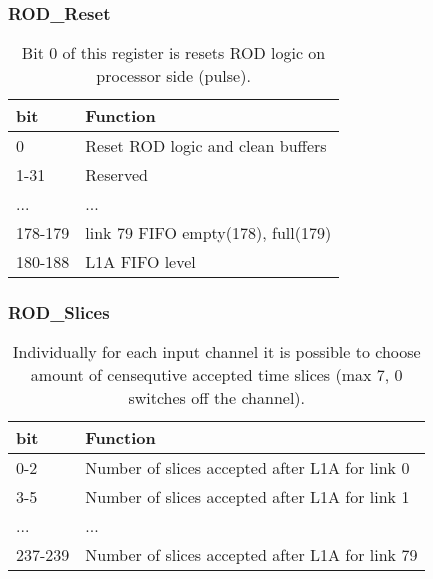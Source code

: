 \subsubsection{ROD\_Reset}
\begin {table}[H]
\begin{center}
\begin{tabular}{|l|l|}
\hline
\textbf{bit} & \textbf{Function} \\
\hline
0 & Reset ROD logic and clean buffers \\ \hline
1-31 & Reserved \\ \hline
... & ...\\ \hline
178-179 & link 79 FIFO empty(178), full(179)\\ \hline
180-188 & L1A FIFO level\\ \hline
\end{tabular}
\caption{Bit 0 of this register is resets ROD logic on processor side (pulse).}
\end{center}
\end{table}

\subsubsection{ROD\_Slices}
\begin {table}[H]
\begin{center}
\begin{tabular}{|l|l|}
\hline
\textbf{bit} & \textbf{Function} \\
\hline
0-2 & Number of slices accepted after L1A for link 0 \\ \hline
3-5 & Number of slices accepted after L1A for link 1 \\ \hline
... & ...\\ \hline
237-239 & Number of slices accepted after L1A for link 79 \\ \hline
\end{tabular}
\caption{Individually for each input channel it is possible to choose amount of censequtive accepted time slices (max 7, 0 switches off the channel).}
\end{center}
\end{table}


